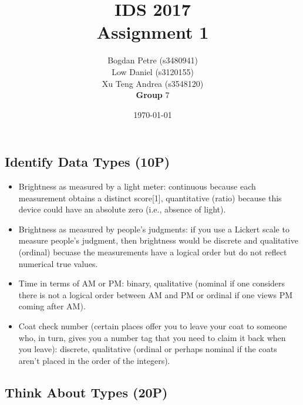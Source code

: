 \documentclass[a4paper]{article}
\title{IDS 2017 \\Assignment 1}
\author{
 Bogdan Petre (s3480941) \\ 
 Low Daniel (s3120155) \\
 Xu Teng Andrea (s3548120) 
 \\ \textbf{Group} 7}
\date{\today}
\begin{document}
\maketitle
\section{}
\subsection{Identify Data Types (10P)}

	\begin{itemize}
		\item Brightness as measured by a light meter: continuous because each measurement obtains a distinct score[1], quantitative (ratio) because this device could have an absolute zero (i.e., absence of light). 
		
		\item Brightness as measured by people’s judgments: if you use a Lickert scale to measure people’s judgment, then brightness would be discrete and qualitative (ordinal) becuase the measurements have a logical order but do not reflect numerical true values.  
		
		\item Time in terms of AM or PM: binary, qualitative (nominal if one considers there is not a logical order between AM and PM or ordinal if one views PM coming after AM).
		
		\item Coat check number (certain places offer you to leave your coat to someone who, in turn, gives
		you a number tag that you need to claim it back when you leave): discrete, qualitative (ordinal or perhaps nominal if the coats aren’t placed in the order of the integers).
	\end{itemize}

	\subsection{}
	\subsection{Think About Types (20P)}
	
\end{document}
